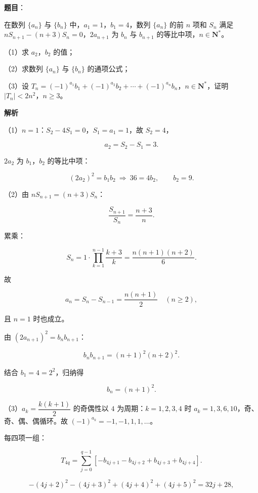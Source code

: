 \begin{answer}

\textbf{题目}：

在数列 $\{a_n\}$ 与 $\{b_n\}$ 中，$a_1=1$，$b_1=4$，数列 $\{a_n\}$ 的前 $n$ 项和 $S_n$ 满足 $nS_{n+1}-(n+3)S_n=0$，$2a_{n+1}$ 为 $b_n$ 与 $b_{n+1}$ 的等比中项，$n\in\mathbf N^*$。

（1）求 $a_2$，$b_2$ 的值；

（2）求数列 $\{a_n\}$ 与 $\{b_n\}$ 的通项公式；

（3）设 $T_n=(-1)^{a_1}b_1+(-1)^{a_2}b_2+\cdots+(-1)^{a_n}b_n$，$n\in\mathbf N^*$，证明 $|T_n|<2n^2$，$n\geqslant3$。

\textbf{解析}

（1）$n=1$：$S_2-4S_1=0$，$S_1=a_1=1$，故 $S_2=4$，

\nopagebreak[4]
\[a_2=S_2-S_1=3.\]

$2a_2$ 为 $b_1$，$b_2$ 的等比中项：

\nopagebreak[4]
\[(2a_2)^2=b_1b_2\ \Longrightarrow\ 36=4b_2,\qquad b_2=9.\]

（2）由 $nS_{n+1}=(n+3)S_n$：

\nopagebreak[4]
\[\frac{S_{n+1}}{S_n}=\frac{n+3}n.\]

累乘：

\nopagebreak[4]
\[S_n=1\cdot\prod_{k=1}^{n-1}\frac{k+3}k=\frac{n(n+1)(n+2)}6.\]

故

\nopagebreak[4]
\[a_n=S_n-S_{n-1}=\frac{n(n+1)}2\quad(n\geqslant2),\]

且 $n=1$ 时也成立。

由 $(2a_{n+1})^2=b_nb_{n+1}$：

\nopagebreak[4]
\[b_nb_{n+1}=(n+1)^2(n+2)^2.\]

结合 $b_1=4=2^2$，归纳得

\nopagebreak[4]
\[b_n=(n+1)^2.\]

（3）$a_k=\dfrac{k(k+1)}2$ 的奇偶性以 $4$ 为周期：$k=1,2,3,4$ 时 $a_k=1,3,6,10$，奇、奇、偶、偶循环。故 $(-1)^{a_k}=-1,-1,1,1,\ldots$。

每四项一组：

\nopagebreak[4]
\[T_{4q}=\sum_{j=0}^{q-1}\left[-b_{4j+1}-b_{4j+2}+b_{4j+3}+b_{4j+4}\right].\]

\nopagebreak[4]
\[- (4j+2)^2-(4j+3)^2+(4j+4)^2+(4j+5)^2=32j+28,\]


\end{answer}
